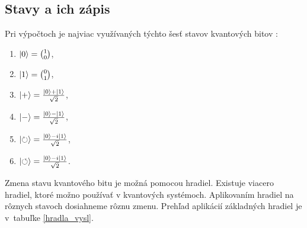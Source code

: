 \subsection{Stavy a ich zápis}

Pri výpočtoch je najviac využívaných týchto šesť stavov kvantových bitov 
\cite{Wei02}:
\begin{enumerate}
\item \(\Ket{0} = \binom{1}{0}\),
\item \(\Ket{1} = \binom{0}{1}\),
\item \(\Ket{+} = \frac{\Ket{0} + \Ket{1}}{\sqrt{2}}\),
\item \(\Ket{-} = \frac{\Ket{0} - \Ket{1}}{\sqrt{2}}\),
\item \(\Ket{\circlearrowright} = \frac{\Ket{0} - i\Ket{1}}{\sqrt{2}}\),
\item \(\Ket{\circlearrowleft} = \frac{\Ket{0} - i\Ket{1}}{\sqrt{2}}\).
\end{enumerate}
Zmena stavu kvantového bitu je možná pomocou hradiel. Existuje viacero
hradiel, ktoré možno používať v kvantových systémoch. Aplikovaním hradiel
na rôznych stavoch dosiahneme rôznu zmenu. Prehľad aplikácií základných 
hradiel je v~tabuľke \ref{hradla_vysl}.

